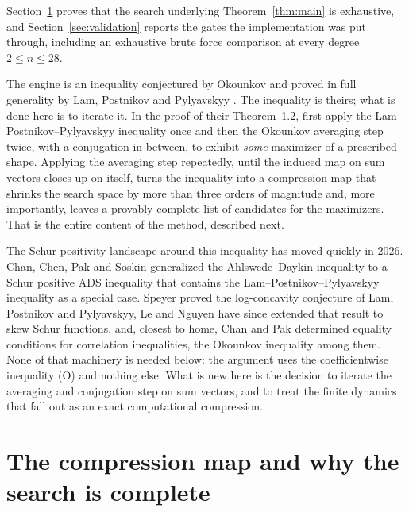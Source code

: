 \documentclass[11pt]{article}
\theoremstyle{remark}
\begin{document}
Section~\ref{sec:method} proves that the search underlying Theorem~\ref{thm:main} is
exhaustive, and Section~\ref{sec:validation} reports the gates
the implementation was put through, including an exhaustive brute force comparison at
every degree $2\le n\le 28$.

The engine is an inequality conjectured by Okounkov \cite{Oko97} and proved in full
generality by Lam, Postnikov and Pylyavskyy \cite[Thm.~11]{LPP07}. The inequality is
theirs; what is done here is to iterate it. In the proof of their Theorem~1.2,
\cite{PS26} first apply the Lam--Postnikov--Pylyavskyy inequality once and then the
Okounkov averaging step twice, with a conjugation in between, to exhibit \emph{some}
maximizer of a prescribed shape. Applying the averaging step repeatedly, until the induced map
on sum vectors closes up on itself, turns the inequality into a compression map that
shrinks the search space by more than three orders of magnitude and, more importantly,
leaves a provably complete list of candidates for the maximizers. That is the entire
content of the method, described next.

The Schur positivity landscape around this inequality has moved quickly in 2026.
Chan, Chen, Pak and Soskin \cite{CCPS26} generalized the
Ahlswede--Daykin inequality to a Schur positive ADS inequality that contains the
Lam--Postnikov--Pylyavskyy inequality as a special case. Speyer \cite{Spe26} proved
the log-concavity conjecture of Lam, Postnikov and Pylyavskyy, Le and Nguyen
\cite{LN26} have since extended that result to skew Schur functions, and,
closest to home,
Chan and Pak \cite{CP26} determined equality conditions for correlation inequalities,
the Okounkov inequality among them. None of that machinery is needed below: the
argument uses the coefficientwise inequality (O) and nothing else. What is new here
is the decision to iterate the averaging and conjugation step on sum vectors, and
to treat the finite dynamics that fall out as an exact computational compression.

\section{The compression map and why the search is complete}\label{sec:method}
\end{document}

